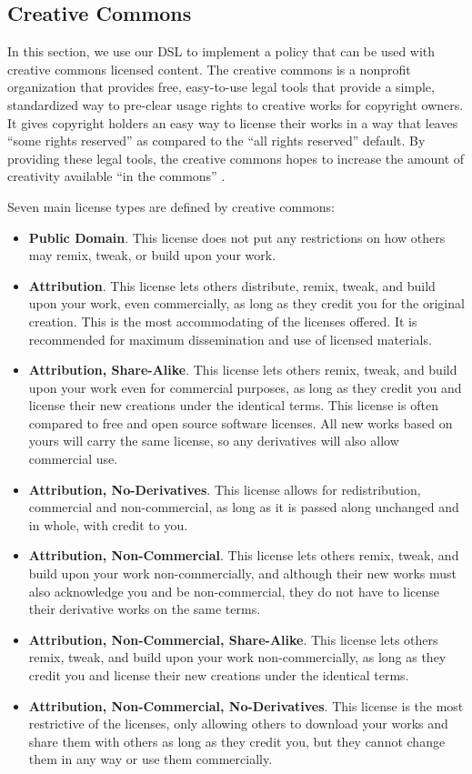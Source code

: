\subsection{Creative Commons}\label{sec:model-cc}
In this section, we use our DSL to implement a policy that can be used with
creative commons licensed content.  The creative commons is a nonprofit
organization that provides free, easy-to-use legal tools that provide a simple,
standardized way to pre-clear usage rights to creative works for copyright
owners.  It gives copyright holders an easy way to license their works in a way
that leaves ``some rights reserved'' as compared to the ``all rights reserved''
default.  By providing these legal tools, the creative commons hopes to
increase the amount of creativity available ``in the commons'' \cite{creative-commons}.

Seven main license types are defined by creative commons:

\begin{itemize}
\item \textbf{Public Domain}. This license does not put any restrictions on how others may remix, tweak, or
build upon your work.
\item \textbf{Attribution}.  This license lets others distribute, remix, tweak, and build upon your work,
even commercially, as long as they credit you for the original creation. This
is the most accommodating of the licenses offered.  It is recommended for
maximum dissemination and use of licensed materials.
\item \textbf{Attribution, Share-Alike}.  This license lets others remix, tweak, and build upon your work even for
commercial purposes, as long as they credit you and license their new creations
under the identical terms.  This license is often compared to free and open
source software licenses.  All new works based on yours will carry the same
license, so any derivatives will also allow commercial use.
\item \textbf{Attribution, No-Derivatives}.  This license allows for redistribution, commercial and non-commercial, as long
as it is passed along unchanged and in whole, with credit to you.
\item \textbf{Attribution, Non-Commercial}.  This license lets others remix, tweak, and build upon your work
non-commercially, and although their new works must also acknowledge you and be
non-commercial, they do not have to license their derivative works on the same
terms.
\item \textbf{Attribution, Non-Commercial, Share-Alike}.  This license lets others remix, tweak, and build upon your work
non-commercially, as long as they credit you and license their new creations
under the identical terms.
\item \textbf{Attribution, Non-Commercial, No-Derivatives}.  This license is the most restrictive of the licenses, only allowing others to
download your works and share them with others as long as they credit you, but
they cannot change them in any way or use them commercially.
\end{itemize}

